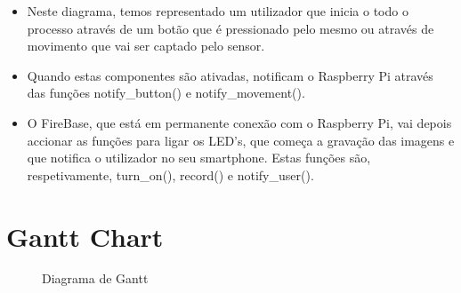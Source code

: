 \documentclass{article}
\begin{document}
\begin{itemize}
    \item Neste diagrama, temos representado um utilizador que inicia o todo o processo através de um botão que é pressionado pelo mesmo ou através de movimento que vai ser captado pelo sensor.

    \item Quando estas componentes são ativadas, notificam o Raspberry Pi através das funções notify\_button() e notify\_movement().

    \item O FireBase, que está em permanente conexão com o Raspberry Pi, vai depois accionar as funções para ligar os LED's, que começa a gravação das imagens e que notifica o utilizador no seu smartphone. Estas funções são, respetivamente, turn\_on(), record() e notify\_user().

\end{itemize}

\section{Gantt Chart}

\begin{figure}[h!]
    \centering
    \caption{Diagrama de Gantt}
    \label{fig:diagGantt}
\end{figure}







%
%
%
% 
\end{document}
